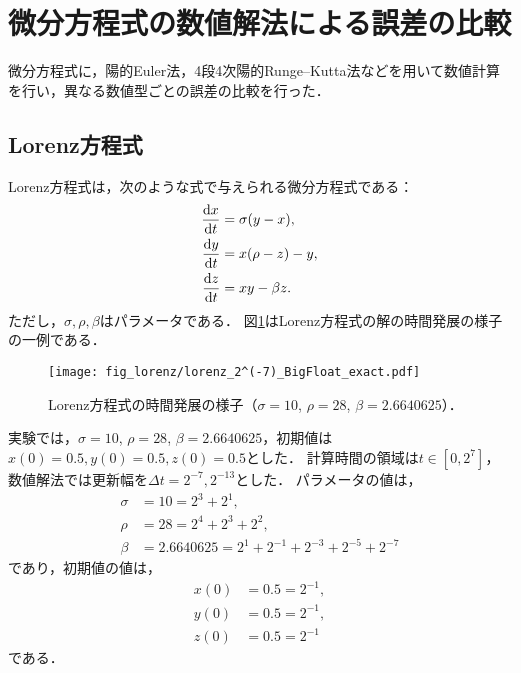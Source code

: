 \section{微分方程式の数値解法による誤差の比較}
微分方程式に，陽的Euler法，4段4次陽的Runge--Kutta法などを用いて数値計算を行い，異なる数値型ごとの誤差の比較を行った．
\subsection{Lorenz方程式}
Lorenz方程式は，次のような式で与えられる微分方程式である：
\begin{align*}
    \frac{\mathrm{d}x}{\mathrm{d}t} &= \sigma(y-x), \\
    \frac{\mathrm{d}y}{\mathrm{d}t} &= x(\rho-z)-y, \\
    \frac{\mathrm{d}z}{\mathrm{d}t} &= xy - \beta z.
\end{align*}
ただし，$\sigma,\rho,\beta$はパラメータである．
図\ref{fig:lorenz}はLorenz方程式の解の時間発展の様子の一例である．
\begin{figure}[H]
    \centering
    \texttt{[image: fig\_lorenz/lorenz\_2^(-7)\_BigFloat\_exact.pdf]}
    \caption{Lorenz方程式の時間発展の様子（$\sigma=10$, $\rho=28$, $\beta=2.6640625$）．}
    \label{fig:lorenz}
\end{figure}
実験では，$\sigma=10$, $\rho=28$, $\beta=2.6640625$，初期値は$x(0) = 0.5, y(0) = 0.5, z(0) = 0.5$とした．
計算時間の領域は$t \in [0,2^7]$，数値解法では更新幅を$\Delta t =  2^{-7}, 2^{-13}$とした．
パラメータの値は，
\begin{align*}
    \sigma &= 10 = 2^3 + 2^1, \\
    \rho &= 28 = 2^4 + 2^3 + 2^2, \\
    \beta &= 2.6640625 = 2^1 + 2^{-1} + 2^{-3} + 2^{-5} + 2^{-7}
\end{align*}
であり，初期値の値は，
\begin{align*}
    x(0) &= 0.5 = 2^{-1}, \\
    y(0) &= 0.5 = 2^{-1}, \\
    z(0) &= 0.5 = 2^{-1}
\end{align*}
である．
